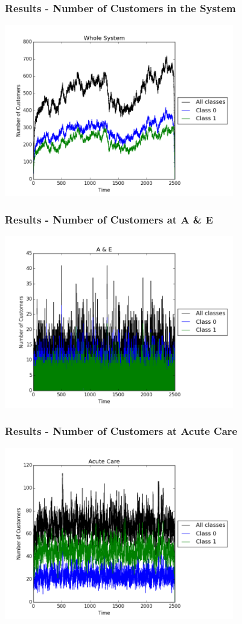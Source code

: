 \documentclass{beamer}
\begin{document}
\begin{frame}
	\frametitle{Results - Number of Customers in the System}
  \includegraphics[width=10cm]{Images/cfm_example_WholeSystem}
\end{frame}

\begin{frame}
	\frametitle{Results - Number of Customers at A \& E}
  \includegraphics[width=10cm]{Images/cfm_example_AandE}
\end{frame}

\begin{frame}
	\frametitle{Results - Number of Customers at Acute Care}
  \includegraphics[width=10cm]{Images/cfm_example_AcuteCare}
\end{frame}
\end{document}
